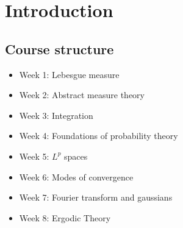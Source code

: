 \documentclass{article}
\begin{document}
\maketitle
\section{Introduction}
\subsection{Course structure}
\begin{itemize}
    \item Week 1: Lebesgue measure
    \item Week 2: Abstract measure theory
    \item Week 3: Integration
    \item Week 4: Foundations of probability theory
    \item Week 5: $L^p$ spaces
    \item Week 6: Modes of convergence
    \item Week 7: Fourier transform and gaussians
   \item Week 8: Ergodic Theory
\end{itemize}
\end{document}
